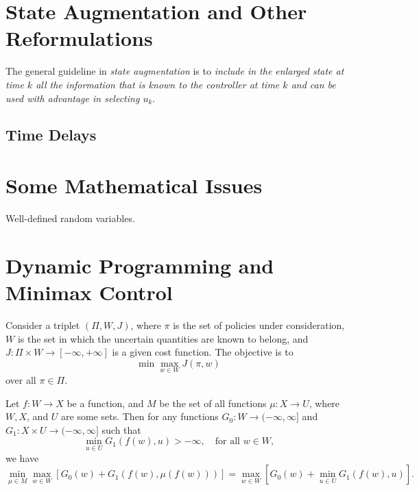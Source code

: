 \section{State Augmentation and Other Reformulations}
The general guideline in \textit{state augmentation} is to \textit{include in the enlarged state at time $k$ all the information that is known to the controller at time $k$ and can be used with advantage in selecting $u_k$}. 
\subsection*{Time Delays}

\section{Some Mathematical Issues}
Well-defined random variables.

\section{Dynamic Programming and Minimax Control}
Consider a triplet $(\Pi,W,J)$, where $\pi$ is the set of policies under consideration, $W$ is the set in which the uncertain quantities are known to belong, and $J:\Pi\times W\rightarrow[-\infty,+\infty]$ is a given cost function. The objective is to 
$$\min\underset{w\in W}{\max}J(\pi,w)$$
over all $\pi\in\Pi$.
\begin{lemma}
Let $f: W \rightarrow X$ be a function, and $M$ be the set of all functions $\mu: X \rightarrow U$, where $W, X$, and $U$ are some sets. Then for any functions $G_0: W \rightarrow(-\infty, \infty]$ and $G_1: X \times U \rightarrow(-\infty, \infty]$ such that $$\min _{u \in U} G_1(f(w), u)>-\infty, \quad \text{for all $w \in W$,} $$we have
$$
\min _{\mu \in M} \max _{w \in W}\left[G_0(w)+G_1(f(w), \mu(f(w)))\right]=\max _{w \in W}\left[G_0(w)+\min _{u \in U} G_1(f(w), u)\right] .
$$
\end{lemma}
